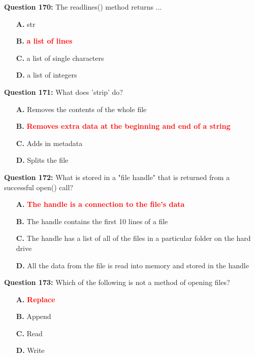 \documentclass[12pt,a4paper]{article}
\begin{document}
\textbf{Question 170:} The readlines() method returns ...

\begin{itemize}
    \item[\textbf{A.}] str
    \item[\textbf{B.}] \textcolor{red}{\textbf{a list of lines}}
    \item[\textbf{C.}] a list of single characters
    \item[\textbf{D.}] a list of integers
\end{itemize}

\vspace{0.5cm}

\textbf{Question 171:} What does 'strip' do?

\begin{itemize}
    \item[\textbf{A.}] Removes the contents of the whole file
    \item[\textbf{B.}] \textcolor{red}{\textbf{Removes extra data at the beginning and end of a string}}
    \item[\textbf{C.}] Adds in metadata
    \item[\textbf{D.}] Splits the file
\end{itemize}

\vspace{0.5cm}

\textbf{Question 172:} What is stored in a "file handle" that is returned from a successful open() call?

\begin{itemize}
    \item[\textbf{A.}] \textcolor{red}{\textbf{The handle is a connection to the file's data}}
    \item[\textbf{B.}] The handle contains the first 10 lines of a file
    \item[\textbf{C.}] The handle has a list of all of the files in a particular folder on the hard drive
    \item[\textbf{D.}] All the data from the file is read into memory and stored in the handle
\end{itemize}

\vspace{0.5cm}

\textbf{Question 173:} Which of the following is not a method of opening files?

\begin{itemize}
    \item[\textbf{A.}] \textcolor{red}{\textbf{Replace}}
    \item[\textbf{B.}] Append
    \item[\textbf{C.}] Read
    \item[\textbf{D.}] Write
\end{itemize}
\end{document}
